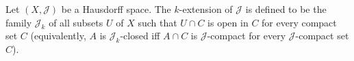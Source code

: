 Let $(X, \mathcal{J})$ be a Hausdorff space. The $k$-extension of $\mathcal{J}$ is defined to be the family $\mathcal{J}_k$ of all subsets $U$ of $X$ such that $U \cap C$ is open in $C$ for every compact set $C$ (equivalently, $A$ is $\mathcal{J}_k$-closed iff $A \cap C$ is $\mathcal{J}$-compact for every $\mathcal{J}$-compact set $C$).
